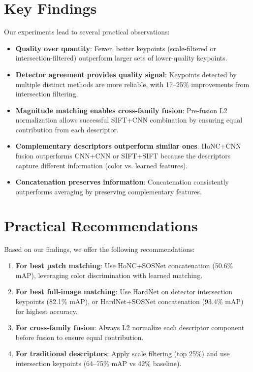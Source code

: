 \section{Key Findings}

Our experiments lead to several practical observations:

\begin{itemize}
    \item \textbf{Quality over quantity}: Fewer, better keypoints (scale-filtered or intersection-filtered) outperform larger sets of lower-quality keypoints.

    \item \textbf{Detector agreement provides quality signal}: Keypoints detected by multiple distinct methods are more reliable, with 17--25\% improvements from intersection filtering.

    \item \textbf{Magnitude matching enables cross-family fusion}: Pre-fusion L2 normalization allows successful SIFT+CNN combination by ensuring equal contribution from each descriptor.

    \item \textbf{Complementary descriptors outperform similar ones}: HoNC+CNN fusion outperforms CNN+CNN or SIFT+SIFT because the descriptors capture different information (color vs. learned features).

    \item \textbf{Concatenation preserves information}: Concatenation consistently outperforms averaging by preserving complementary features.
\end{itemize}

\section{Practical Recommendations}

Based on our findings, we offer the following recommendations:

\begin{enumerate}
    \item \textbf{For best patch matching}: Use HoNC+SOSNet concatenation (50.6\% mAP), leveraging color discrimination with learned matching.

    \item \textbf{For best full-image matching}: Use HardNet on detector intersection keypoints (82.1\% mAP), or HardNet+SOSNet concatenation (93.4\% mAP) for highest accuracy.

    \item \textbf{For cross-family fusion}: Always L2 normalize each descriptor component before fusion to ensure equal contribution.

    \item \textbf{For traditional descriptors}: Apply scale filtering (top 25\%) and use intersection keypoints (64--75\% mAP vs 42\% baseline).
\end{enumerate}

